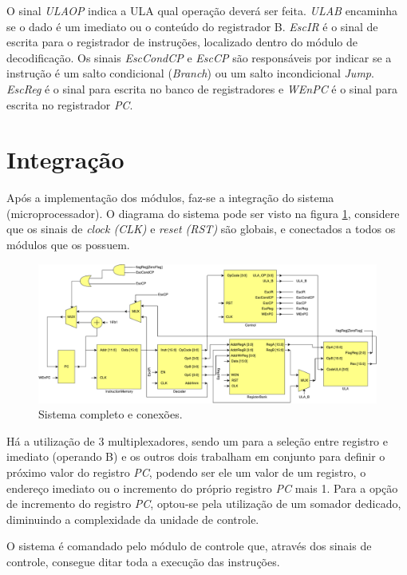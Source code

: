 \documentclass[11pt,a4paper,titlepage]{article}
\begin{document}
O sinal \textit{ULAOP} indica a ULA qual operação deverá ser feita. \textit{ULAB} encaminha se o dado é um imediato ou o conteúdo do registrador B. \textit{EscIR} é o sinal de escrita para o registrador de instruções, localizado dentro do módulo de decodificação. Os sinais \textit{EscCondCP} e \textit{EscCP} são responsáveis por indicar se a instrução é um salto condicional (\textit{Branch}) ou um salto incondicional \textit{Jump}. \textit{EscReg} é o sinal para escrita no banco de registradores e \textit{WEnPC} é o sinal para escrita no registrador \textit{PC}.

\section{Integração}

Após a implementação dos módulos, faz-se a integração do sistema (microprocessador). O diagrama do sistema pode ser visto na figura \ref{fig:microprocessor}, considere que os sinais de \textit{clock (CLK)} e \textit{reset (RST)} são globais, e conectados a todos os módulos que os possuem.

\begin{figure}[h]
\centering
\includegraphics[scale=0.4]{images/Microprocessor.pdf}
\caption{Sistema completo e conexões.}
\label{fig:microprocessor}
\end{figure}

Há a utilização de 3 multiplexadores, sendo um para a seleção entre registro e imediato (operando B) e os outros dois trabalham em conjunto para definir o próximo valor do registro \textit{PC}, podendo ser ele um valor de um registro, o endereço imediato ou o incremento do próprio registro \textit{PC} mais 1. Para a opção de incremento do registro \textit{PC}, optou-se pela utilização de um somador dedicado, diminuindo a complexidade da unidade de controle.

O sistema é comandado pelo módulo de controle que, através dos sinais de controle, consegue ditar toda a execução das instruções.
\end{document}
